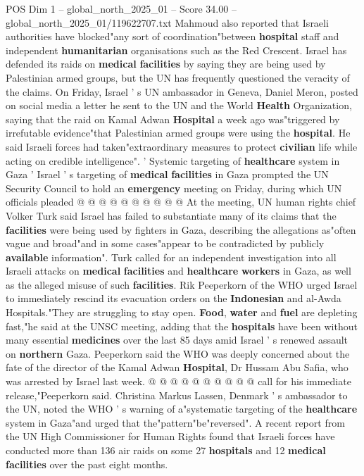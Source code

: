 \begin{textsample}{POS Dim 1 – global\_north\_2025\_01 – Score 34.00 – global\_north\_2025\_01/119622707.txt}
Mahmoud also reported that Israeli authorities have blocked"any sort of coordination"between \textbf{hospital} staff and independent \textbf{humanitarian} organisations such as the Red Crescent.
Israel has defended its raids on \textbf{medical} \textbf{facilities} by saying they are being used by Palestinian armed groups, but the UN has frequently questioned the veracity of the claims.
On Friday, Israel ' s UN ambassador in Geneva, Daniel Meron, posted on social media a letter he sent to the UN and the World \textbf{Health} Organization, saying that the raid on Kamal Adwan \textbf{Hospital} a week ago was"triggered by irrefutable evidence"that Palestinian armed groups were using the \textbf{hospital}.
He said Israeli forces had taken"extraordinary measures to protect \textbf{civilian} life while acting on credible intelligence". ' Systemic targeting of \textbf{healthcare} system in Gaza ' Israel ' s targeting of \textbf{medical} \textbf{facilities} in Gaza prompted the UN Security Council to hold an \textbf{emergency} meeting on Friday, during which UN officials pleaded @ @ @ @ @ @ @ @ @ @ At the meeting, UN human rights chief Volker Turk said Israel has failed to substantiate many of its claims that the \textbf{facilities} were being used by fighters in Gaza, describing the allegations as"often vague and broad"and in some cases"appear to be contradicted by publicly \textbf{available} information".
Turk called for an independent investigation into all Israeli attacks on \textbf{medical} \textbf{facilities} and \textbf{healthcare} \textbf{workers} in Gaza, as well as the alleged misuse of such \textbf{facilities}.
Rik Peeperkorn of the WHO urged Israel to immediately rescind its evacuation orders on the \textbf{Indonesian} and al-Awda Hospitals."They are struggling to stay open. \textbf{Food}, \textbf{water} and \textbf{fuel} are depleting fast,"he said at the UNSC meeting, adding that the \textbf{hospitals} have been without many essential \textbf{medicines} over the last 85 days amid Israel ' s renewed assault on \textbf{northern} Gaza.
Peeperkorn said the WHO was deeply concerned about the fate of the director of the Kamal Adwan \textbf{Hospital}, Dr Hussam Abu Safia, who was arrested by Israel last week. @ @ @ @ @ @ @ @ @ @ call for his immediate release,"Peeperkorn said.
Christina Markus Lassen, Denmark ' s ambassador to the UN, noted the WHO ' s warning of a"systematic targeting of the \textbf{healthcare} system in Gaza"and urged that the"pattern"be"reversed".
A recent report from the UN High Commissioner for Human Rights found that Israeli forces have conducted more than 136 air raids on some 27 \textbf{hospitals} and 12 \textbf{medical} \textbf{facilities} over the past eight months.

\end{textsample}
